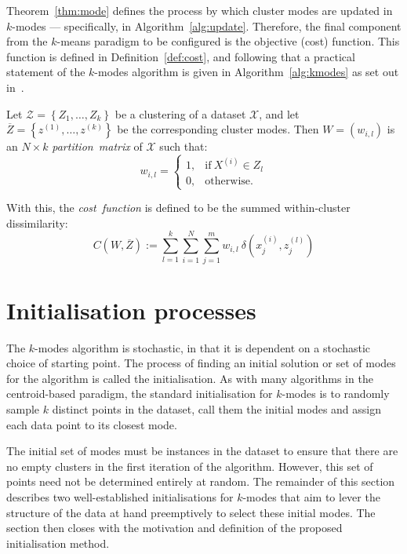 Theorem~\ref{thm:mode} defines the process by which cluster modes are updated in
\(k\)-modes --- specifically, in Algorithm~\ref{alg:update}. Therefore, the
final component from the \(k\)-means paradigm to be configured is the objective
(cost) function. This function is defined in Definition~\ref{def:cost}, and
following that a practical statement of the \(k\)-modes algorithm is given in
Algorithm~\ref{alg:kmodes} as set out in~\cite{Huang1998}.

\begin{definition}\label{def:cost}
    Let \(\mathcal{Z} = \left\{Z_1, \ldots, Z_k\right\}\) be a clustering of a
    dataset \(\mathcal{X}\), and let \(\overline Z = \left\{z^{(1)},
    \ldots, z^{(k)}\right\}\) be the corresponding cluster modes. Then \(W =
    \left(w_{i, l}\right)\) is an \(N \times k\) \emph{partition~matrix} of
    \(\mathcal{X}\) such that:
    \[
        w_{i, l} = \begin{cases}
                     1, & \text{if} \ X^{(i)} \in Z_l\\
                     0, & \text{otherwise.}
                   \end{cases}
    \]

    With this, the \emph{cost~function} is defined to be the summed
    within-cluster dissimilarity:
    \begin{equation}\label{eq:cost}
        C\left(W, \overline Z\right) := \sum_{l=1}^{k} \sum_{i=1}^{N}
        \sum_{j=1}^{m} w_{i,l} \ \delta\left(x_j^{(i)}, z_j^{(l)}\right)
    \end{equation}
\end{definition}



\section{Initialisation processes}\label{sec:inits}

The \(k\)-modes algorithm is stochastic, in that it is dependent on a stochastic
choice of starting point. The process of finding an initial solution or set of
modes for the algorithm is called the initialisation. As with many algorithms in
the centroid-based paradigm, the standard initialisation for \(k\)-modes is to
randomly sample \(k\) distinct points in the dataset, call them the initial
modes and assign each data point to its closest mode.

The initial set of modes must be instances in the dataset to ensure that there
are no empty clusters in the first iteration of the algorithm. However, this set
of points need not be determined entirely at random. The remainder of this
section describes two well-established initialisations for \(k\)-modes that aim
to lever the structure of the data at hand preemptively to select these initial
modes. The section then closes with the motivation and definition of the
proposed initialisation method.

